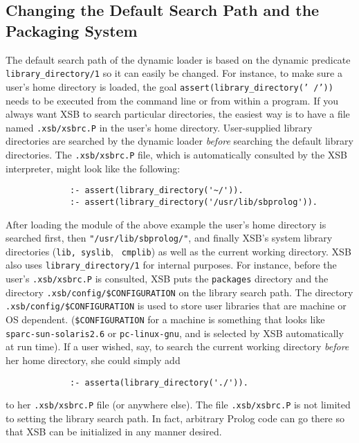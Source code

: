 \subsection{Changing the Default Search Path and the Packaging System}

\begin{description}
\end{description}
The default search path of the dynamic loader is based on the dynamic
predicate {\tt library\_directory/1} so it can easily be changed.  For
instance, to make sure a user's home directory is loaded, the goal
{\tt assert(library\_directory('~/'))} needs to be executed from the
command line or from within a program.  If you always want XSB to
search particular directories, the easiest way is to have a file named
{\verb|.xsb/xsbrc.P|} in the user's home directory.  User-supplied
library directories are searched by the dynamic loader {\em before}
searching the default library directories.  The {\verb|.xsb/xsbrc.P|}
file, which is automatically consulted by the XSB interpreter, might
look like the following:
\begin{verbatim}
             :- assert(library_directory('~/')).
             :- assert(library_directory('/usr/lib/sbprolog')).
\end{verbatim}

After loading the module of the above example the user's home
directory is searched first, then {\tt "/usr/lib/sbprolog/"}, and
finally XSB's system library directories ({\tt lib, syslib}, {\tt
  cmplib}) as well as the current working directory.  XSB also uses
{\tt library\_directory/1} for internal purposes.  For instance,
before the user's {\verb|.xsb/xsbrc.P|} is consulted, XSB puts the
{\tt packages} directory and the directory
\verb|.xsb/config/$CONFIGURATION| on the library search path.  The
directory \verb'.xsb/config/$CONFIGURATION' is used to store user
libraries that are machine or OS dependent. (\verb'$CONFIGURATION' for
a machine is something that looks like {\tt sparc-sun-solaris2.6} or
{\tt pc-linux-gnu}, and is selected by XSB automatically at run time).
If a user wished, say, to search the current working directory {\em
  before} her home directory, she could simply add 
\begin{verbatim}
             :- asserta(library_directory('./')).
\end{verbatim}
to her {\verb|.xsb/xsbrc.P|} file (or anywhere else).  The file
{\verb|.xsb/xsbrc.P|} is not limited to setting the library search
path.  In fact, arbitrary Prolog code can go there so that XSB can be
initialized in any manner desired.

